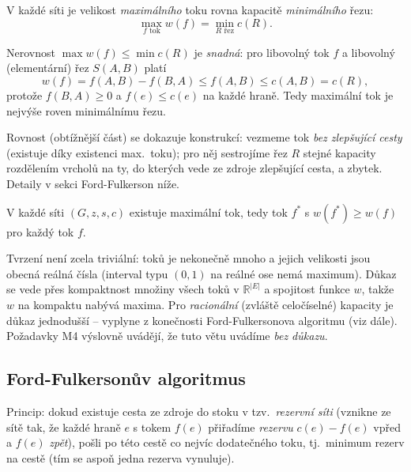 \documentclass[11pt,a4paper]{article}
\begin{document}
\begin{veta}[Hlavní věta o tocích / max-flow = min-cut]
V každé síti je velikost \emph{maximálního} toku rovna kapacitě \emph{minimálního} řezu:
\[ \max_{f\text{ tok}}w(f)=\min_{R\text{ řez}}c(R). \]
\end{veta}

\begin{intuice}
Nerovnost $\max w(f)\le\min c(R)$ je \emph{snadná}: pro libovolný tok $f$ a libovolný (elementární) řez $S(A,B)$ platí
\[ w(f)=f(A,B)-f(B,A)\le f(A,B)\le c(A,B)=c(R), \]
protože $f(B,A)\ge 0$ a $f(e)\le c(e)$ na každé hraně. Tedy maximální tok je nejvýše roven minimálnímu řezu.

Rovnost (obtížnější část) se dokazuje konstrukcí: vezmeme tok \emph{bez zlepšující cesty} (existuje díky existenci max.\ toku); pro něj sestrojíme řez $R$ stejné kapacity rozdělením vrcholů na ty, do kterých vede ze zdroje zlepšující cesta, a zbytek. Detaily v sekci Ford-Fulkerson níže.
\end{intuice}

\begin{veta}
V každé síti $(G,z,s,c)$ existuje maximální tok, tedy tok $f^*$ s $w(f^*)\ge w(f)$ pro každý tok $f$.
\end{veta}

\begin{poznamka}
Tvrzení není zcela triviální: toků je nekonečně mnoho a jejich velikosti jsou obecná reálná čísla (interval typu $(0,1)$ na reálné ose nemá maximum). Důkaz se vede přes kompaktnost množiny všech toků v $\mathbb{R}^{|E|}$ a spojitost funkce $w$, takže $w$ na kompaktu nabývá maxima. Pro \emph{racionální} (zvláště celočíselné) kapacity je důkaz jednodušší -- vyplyne z konečnosti Ford-Fulkersonova algoritmu (viz dále). Požadavky M4 výslovně uvádějí, že tuto větu uvádíme \emph{bez důkazu}.
\end{poznamka}

\subsection{Ford-Fulkersonův algoritmus}

Princip: dokud existuje cesta ze zdroje do stoku v tzv.\ \emph{rezervní síti} (vznikne ze sítě tak, že každé hraně $e$ s tokem $f(e)$ přiřadíme \emph{rezervu} $c(e)-f(e)$ vpřed a $f(e)$ \emph{zpět}), pošli po této cestě co nejvíc dodatečného toku, tj.\ minimum rezerv na cestě (tím se aspoň jedna rezerva vynuluje).
\end{document}

